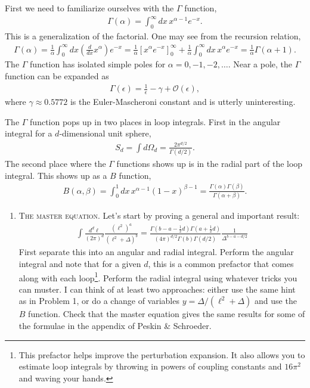 \documentclass[12pt]{article}
\begin{document}
\begin{enumerate}
First we need to familiarize ourselves with the $\Gamma$ function,
\begin{align*}
\Gamma(\alpha)=\int_0^\infty dx\, x^{\alpha-1} e^{-x}.
\end{align*}
This is a generalization of the factorial. One may see from the recursion relation,
\begin{align*}
\Gamma(\alpha)= \frac{1}{\alpha}
\int_0^\infty dx \left(\frac{d}{dx} x^\alpha\right) e^{-x} 
= \frac{1}{\alpha}\left[x^\alpha e^{-x}\right]^\infty_0 + 
\frac{1}{\alpha}\int_0^\infty dx\, x^\alpha e^{-x}
= \frac{1}{\alpha}\Gamma(\alpha+1).
\end{align*}
The $\Gamma$ function has isolated simple poles for $\alpha = 0, -1, -2, \ldots$. Near a pole, the $\Gamma$ function can be expanded as
\begin{align*}
\Gamma(\epsilon) = \frac{1}{\epsilon} - \gamma + \mathcal O(\epsilon),
\end{align*}
where $\gamma\approx 0.5772$ is the Euler-Mascheroni constant and is utterly uninteresting.

The $\Gamma$ function pops up in two places in loop integrals. First in the angular integral for a $d$-dimensional unit sphere,
\begin{align*}
S_d = \int d\Omega_d = \frac{2\pi^{d/2}}{\Gamma(d/2)}.
\end{align*}
The second place where the $\Gamma$ functions shows up is in the radial part of the loop integral. This shows up as a $B$ function,
\begin{align*}
B(\alpha,\beta) = \int_0^1 dx\, x^{\alpha-1} (1-x)^{\beta-1} = \frac{\Gamma(\alpha)\Gamma(\beta)}{\Gamma(\alpha+\beta)}.
\end{align*}



\begin{enumerate}
\item \textsc{The master equation}. Let's start by proving a general and important result:
\begin{align}
\int \frac{d^d \ell}{(2\pi)^d}
\frac{(\ell^2)^a}{(\ell^2+\Delta)^b}
=
\frac{
\Gamma(b-a-\frac 12 d)\Gamma(a+\frac 12 d)
}{
(4\pi)^{d/2}\Gamma(b)\Gamma(d/2)
}
\frac{1}{\Delta^{b-a-d/2}}\label{eq:dimreg:master}
\end{align}
First separate this into an angular and radial integral. Perform the angular integral and note that for a given $d$, this is a common prefactor that comes along with each loop\footnote{This prefactor helps improve the perturbation expansion. It also allows you to estimate loop integrals by throwing in powers of coupling constants and $16\pi^2$ and waving your hands.}. Perform the radial integral using whatever tricks you can muster. I can think of at least two approaches: either use the same hint as in Problem 1, or do a change of variables $y = \Delta/(\ell^2+\Delta)$ and use the $B$ function. Check that the master equation gives the same results for some of the formulae in the appendix of Peskin \& Schroeder.



\end{enumerate}
\end{enumerate}
\end{document}
